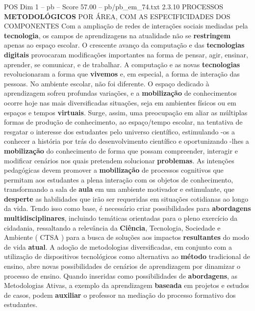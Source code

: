\begin{textsample}{POS Dim 1 – pb – Score 57.00 – pb/pb\_em\_74.txt}  \label{ex:f1_pos_146}
2.3.10 PROCESSOS \textbf{METODOLÓGICOS} POR ÁREA, COM AS ESPECIFICIDADES DOS COMPONENTES Com a ampliação de redes de interações sociais mediadas pela \textbf{tecnologia}, os campos de aprendizagens na atualidade não se \textbf{restringem} apenas ao espaço escolar.
O crescente avanço da computação e das \textbf{tecnologias} \textbf{digitais} provocaram modificações importantes na forma de pensar, agir, ensinar, aprender, se comunicar, e de trabalhar.
A computação e as novas \textbf{tecnologias} revolucionaram a forma que \textbf{vivemos} e, em especial, a forma de interação das pessoas.
No ambiente escolar, não foi diferente.
O espaço dedicado à aprendizagem sofreu profundas variações, e a \textbf{mobilização} de conhecimentos ocorre hoje nas mais diversificadas situações, seja em ambientes físicos ou em espaços e tempos \textbf{virtuais}.
Surge, assim, uma preocupação em aliar as múltiplas formas de produção de conhecimento, ao espaço/tempo escolar, na tentativa de resgatar o interesse dos estudantes pelo universo científico, estimulando -os a conhecer a história por trás do desenvolvimento científico e oportunizando -lhes a \textbf{mobilização} do conhecimento de forma que possam compreender, interagir e modificar cenários nos quais pretendem solucionar \textbf{problemas}.
As intenções pedagógicas devem promover a \textbf{mobilização} de processos cognitivos que permitam aos estudantes a plena interação com os objetos de conhecimento, transformando a sala de \textbf{aula} em um ambiente motivador e estimulante, que \textbf{desperte} as habilidades que irão ser requeridas em situações cotidianas ao longo da vida.
Tendo isso como base, é necessário criar possibilidades para \textbf{abordagens} \textbf{multidisciplinares}, incluindo temáticas orientadas para o pleno exercício da cidadania, ressaltando a relevância da \textbf{Ciência}, Tecnologia, Sociedade e Ambiente ( CTSA ) para a busca de soluções aos impactos \textbf{resultantes} do modo de vida \textbf{atual}.
A adoção de metodologias diversificadas, em conjunto com a utilização de dispositivos tecnológicos como alternativa ao \textbf{método} tradicional de ensino, abre novas possibilidades de cenários de aprendizagem por dinamizar o processo de ensino.
Quando inseridas como possibilidades de \textbf{abordagens}, as Metodologias Ativas, a exemplo da aprendizagem \textbf{baseada} em projetos e estudos de casos, podem \textbf{auxiliar} o professor na mediação do processo formativo dos estudantes.

\end{textsample}
